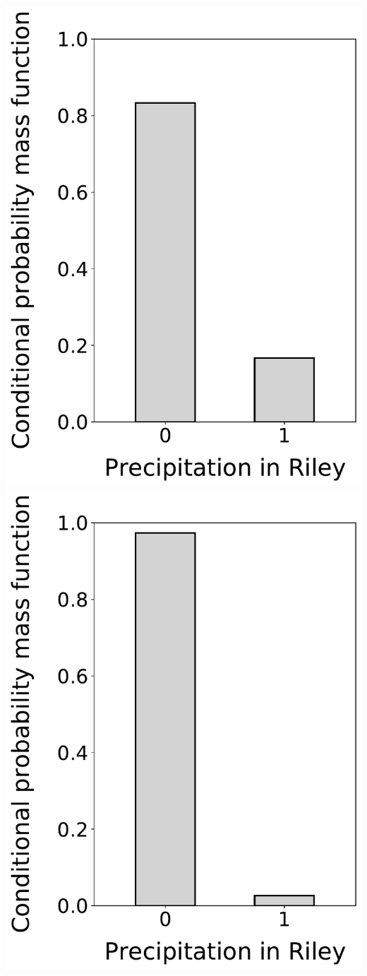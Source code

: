 \documentclass[12pt,twoside]{article}
\begin{document}
\begin{enumerate}
\includegraphics[scale=.5]{precipitation_cond_pmf_3_given_1eq1_2eq1.pdf}
\includegraphics[scale=.5]{precipitation_cond_pmf_3_given_2eq0.pdf}

\end{enumerate}
\end{document}
